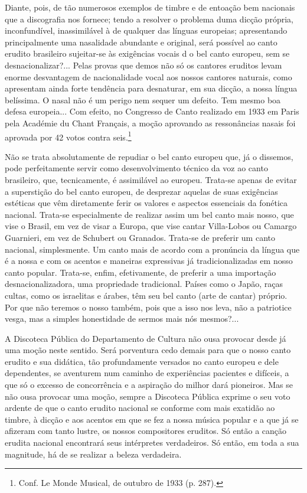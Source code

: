 Diante, pois, de tão numerosos exemplos de timbre e de entoação bem
nacionais que a discografia nos fornece; tendo a resolver o problema
duma dicção própria, inconfundível, inassimilável à de qualquer das
línguas europeias; apresentando principalmente uma nasalidade abundante
e original, será possível ao canto erudito brasileiro sujeitar-se às
exigências vocais d o bel canto europeu, sem se desnacionalizar?...
Pelas provas que demos não só os cantores eruditos levam enorme
desvantagem de nacionalidade vocal aos nossos cantores naturais, como
apresentam ainda forte tendência para desnaturar, em sua dicção, a nossa
língua belíssima. O nasal não é um perigo nem sequer um defeito. Tem
mesmo boa defesa europeia... Com efeito, no Congresso de Canto realizado
em 1933 em Paris pela Académie du Chant Français, a moção aprovando as
ressonâncias nasais foi aprovada por 42 votos contra seis.\footnote{Conf. Le Monde Musical, de outubro de 1933 (p. 287).}

Não se trata absolutamente de repudiar o bel canto europeu que, já o
dissemos, pode perfeitamente servir como desenvolvimento técnico da voz
ao canto brasileiro, que, tecnicamente, é assimilável ao europeu.
Trata-se apenas de evitar a superstição do bel canto europeu, de
desprezar aquelas de suas exigências estéticas que vêm diretamente ferir
os valores e aspectos essenciais da fonética nacional. Trata-se
especialmente de realizar assim um bel canto mais nosso, que vise o
Brasil, em vez de visar a Europa, que vise cantar Villa-Lobos ou Camargo
Guarnieri, em vez de Schubert ou Granados. Trata-se de preferir um canto
nacional, simplesmente. Um canto mais de acordo com a pronúncia da
língua que é a nossa e com os acentos e maneiras expressivas já
tradicionalizadas em nosso canto popular. Trata-se, enfim, efetivamente,
de preferir a uma importação desnacionalizadora, uma propriedade
tradicional. Países como o Japão, raças cultas, como os israelitas e
árabes, têm seu bel canto (arte de cantar) próprio. Por que não teremos
o nosso também, pois que a isso nos leva, não a patriotice vesga, mas a
simples honestidade de sermos mais nós mesmos?...

A Discoteca Pública do Departamento de Cultura não ousa provocar desde
já uma moção neste sentido. Será porventura cedo demais para que o nosso
canto erudito e sua didática, tão profundamente versados no canto
europeu e dele dependentes, se aventurem num caminho de experiências
pacientes e difíceis, a que só o excesso de concorrência e a aspiração
do milhor dará pioneiros. Mas se não ousa provocar uma moção, sempre a
Discoteca Pública exprime o seu voto ardente de que o canto erudito
nacional se conforme com mais exatidão ao timbre, à dicção e aos acentos
em que se fez a nossa música popular e a que já se afizeram com tanto
lustre, os nossos compositores eruditos. Só então a canção erudita
nacional encontrará seus intérpretes verdadeiros. Só então, em toda a
sua magnitude, há de se realizar a beleza verdadeira.


